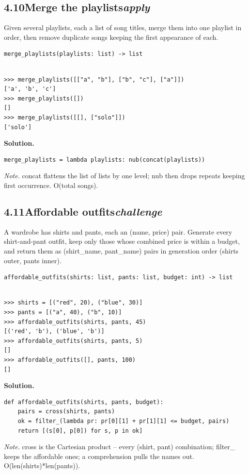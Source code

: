 \documentclass[10pt,letterpaper]{book}
\begin{document}
\subsection*{4.10\quad Merge the playlists\hfill\textnormal{\textit{apply}}}
Given several playlists, each a list of song titles, merge them into one playlist in order, then remove duplicate songs keeping the first appearance of each.

\noindent\texttt{merge\_playlists(playlists: list) -> list}
\begin{lstlisting}[style=ex]

>>> merge_playlists([["a", "b"], ["b", "c"], ["a"]])
['a', 'b', 'c']
>>> merge_playlists([])
[]
>>> merge_playlists([[], ["solo"]])
['solo']

\end{lstlisting}
\noindent\textbf{Solution.}
\begin{lstlisting}[style=code]
merge_playlists = lambda playlists: nub(concat(playlists))
\end{lstlisting}
\noindent\textit{Note.} concat flattens the list of lists by one level; nub then drops repeats keeping first occurrence. O(total songs).

\subsection*{4.11\quad Affordable outfits\hfill\textnormal{\textit{challenge}}}
A wardrobe has shirts and pants, each an (name, price) pair. Generate every shirt-and-pant outfit, keep only those whose combined price is within a budget, and return them as (shirt\_name, pant\_name) pairs in generation order (shirts outer, pants inner).

\noindent\texttt{affordable\_outfits(shirts: list, pants: list, budget: int) -> list}
\begin{lstlisting}[style=ex]

>>> shirts = [("red", 20), ("blue", 30)]
>>> pants = [("a", 40), ("b", 10)]
>>> affordable_outfits(shirts, pants, 45)
[('red', 'b'), ('blue', 'b')]
>>> affordable_outfits(shirts, pants, 5)
[]
>>> affordable_outfits([], pants, 100)
[]

\end{lstlisting}
\noindent\textbf{Solution.}
\begin{lstlisting}[style=code]
def affordable_outfits(shirts, pants, budget):
    pairs = cross(shirts, pants)
    ok = filter_(lambda pr: pr[0][1] + pr[1][1] <= budget, pairs)
    return [(s[0], p[0]) for s, p in ok]
\end{lstlisting}
\noindent\textit{Note.} cross is the Cartesian product -- every (shirt, pant) combination; filter\_ keeps the affordable ones; a comprehension pulls the names out. O(len(shirts)*len(pants)).
\end{document}
